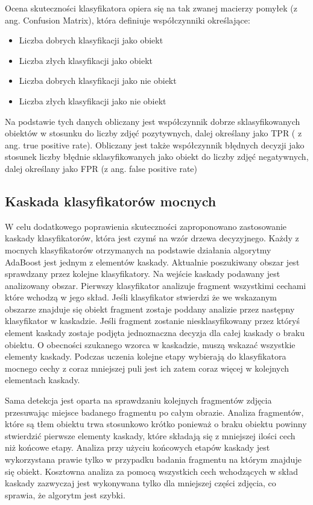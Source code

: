 Ocena skuteczności klasyfikatora opiera się na tak zwanej macierzy pomyłek (z ang. Confusion Matrix), która definiuje współczynniki określające:
\begin{itemize}
    \item Liczba dobrych klasyfikacji jako obiekt
    \item Liczba złych klasyfikacji jako obiekt
    \item Liczba dobrych klasyfikacji jako nie obiekt
    \item Liczba złych klasyfikacji jako nie obiekt
\end{itemize}

Na podstawie tych danych obliczany jest współczynnik dobrze sklasyfikowanych obiektów w stosunku do liczby zdjęć pozytywnych, dalej określany jako TPR ( z ang. true positive rate). Obliczany jest także współczynnik błędnych decyzji jako stosunek liczby błędnie sklasyfikowanych jako obiekt do liczby zdjęć negatywnych, dalej określany jako FPR (z ang. false positive rate)

\subsection{Kaskada klasyfikatorów mocnych}
W celu dodatkowego poprawienia skuteczności zaproponowano zastosowanie kaskady klasyfikatorów, która jest czymś na wzór drzewa decyzyjnego. Każdy z mocnych klasyfikatorów otrzymanych na podstawie działania algorytmy AdaBoost jest jednym z elementów kaskady. Aktualnie poszukiwany obszar jest sprawdzany przez kolejne klasyfikatory. Na wejście kaskady podawany jest analizowany obszar. Pierwszy klasyfikator analizuje fragment wszystkimi cechami które wchodzą w jego skład. Jeśli klasyfikator stwierdzi że we wskazanym obszarze znajduje się obiekt fragment zostaje poddany analizie przez następny klasyfikator w kaskadzie. Jeśli fragment zostanie niesklasyfikowany przez któryś element kaskady zostaje podjęta jednoznaczna decyzja dla całej kaskady o braku obiektu. O obecności szukanego wzorca w kaskadzie, muszą wskazać wszystkie elementy kaskady. Podczas uczenia kolejne etapy wybierają do klasyfikatora mocnego cechy z coraz mniejszej puli jest ich zatem coraz więcej w kolejnych elementach kaskady. 
	
Sama detekcja jest oparta na sprawdzaniu kolejnych fragmentów zdjęcia przesuwając miejsce badanego fragmentu po całym obrazie. Analiza fragmentów, które są tłem obiektu trwa stosunkowo krótko ponieważ o braku obiektu powinny stwierdzić pierwsze elementy kaskady, które składają się z mniejszej ilości cech niż końcowe etapy. Analiza przy użyciu końcowych etapów kaskady jest wykorzystana prawie tylko w przypadku badania fragmentu na którym znajduje się obiekt.
Kosztowna analiza za pomocą wszystkich cech wchodzących w skład kaskady zazwyczaj jest wykonywana tylko dla mniejszej części zdjęcia, co sprawia, że algorytm jest szybki.
